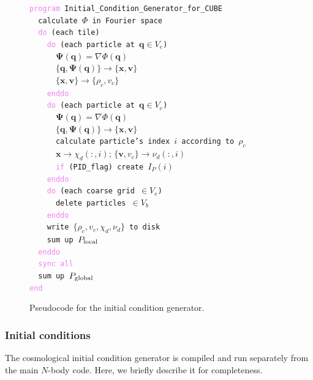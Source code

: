\documentclass[10pt,twocolumn,reprint]{emulateapj}
\newcommand{\bs}{\boldsymbol}
\newcommand{\tcv}{\textcolor{violet}}
\begin{document}
\begin{figure}[t]
{\tt \tcv{program} Initial\_Condition\_Generator\_for\_CUBE\\
\indent \ \ calculate $\Phi$ in Fourier space\\
\indent \ \ \tcv{do} (each tile)\\
\indent \ \ \ \ \tcv{do} (each particle at ${\bs q}\in V_e$)\\
\indent \ \ \ \ \ \ ${\bs \Psi}({\bs q})=\nabla\Phi({\bs q})$\\
\indent \ \ \ \ \ \ $\{{\bs q},{\bs\Psi({\bs q})}\}\rightarrow\{{\bs x},{\bs v}\}$\\
\indent \ \ \ \ \ \ $\{{\bs x},{\bs v}\}\rightarrow \{\rho_c,v_c\}$\\
\indent \ \ \ \     \tcv{enddo}\\
\indent \ \ \ \ \tcv{do} (each particle at ${\bs q}\in V_e$)\\
\indent \ \ \ \ \ \ ${\bs \Psi}({\bs q})=\nabla\Phi({\bs q})$\\
\indent \ \ \ \ \ \ $\{{\bs q},{\bs\Psi({\bs q})}\}\rightarrow\{{\bs x},{\bs v}\}$\\
\indent \ \ \ \ \ \ calculate particle's index $i$ according to $\rho_c$\\
\indent \ \ \ \ \ \ ${\bs x}\rightarrow\chi_d(:,i);\,\{{\bs v},v_c\}\rightarrow\nu_d(:,i)$\\
\indent \ \ \ \ \ \ \tcv{if} (PID\_flag) create $I_P(i)$\\
\indent \ \ \ \ \tcv{enddo}\\
\indent \ \ \ \ \tcv{do} (each coarse grid $\in V_e$)\\
\indent \ \ \ \ \ \ delete particles $\in V_b$\\
\indent \ \ \ \ \tcv{enddo}\\
\indent \ \ \ \ write $\{\rho_c,v_c,\chi_d,\nu_d\}$ to disk\\
\indent \ \ \ \ sum up $P_{\rm local}$\\
\indent \ \ \tcv{enddo}\\
\indent \ \ \tcv{sync all}\\
\indent \ \ sum up $P_{\rm global}$\\
\tcv{end}\\}
\caption{Pseudocode for the initial condition generator.}
\label{fig.ic}
\end{figure}

\subsubsection{Initial conditions}\label{sss.ic}
The cosmological initial condition generator is compiled and run separately from the main $N$-body code. Here, we briefly describe it for completeness.
\end{document}
